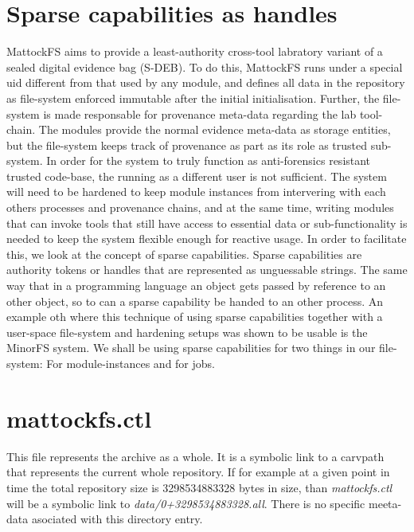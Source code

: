 \section{Sparse capabilities as handles}
MattockFS aims to provide a least-authority cross-tool labratory variant of a sealed digital evidence bag (S-DEB). To do this, MattockFS runs under a special uid different from that used by any module, and defines all data in the repository as file-system enforced immutable after the initial initialisation. Further, the file-system is made responsable for provenance meta-data regarding the lab tool-chain. The modules provide the normal evidence meta-data as storage entities, but the file-system keeps track of provenance as part as its role as trusted sub-system. In order for the system to truly function as anti-forensics resistant trusted code-base, the running as a different user is not sufficient. The system will need to be hardened to keep module instances from intervering with each others processes and provenance chains, and at the same time, writing modules that can invoke tools that still have access to essential data or sub-functionality is needed to keep the system flexible enough for reactive usage.
In order to facilitate this, we look at the concept of sparse capabilities. Sparse capabilities are authority tokens or handles that are represented as unguessable strings. The same way that in a programming language an object gets passed by reference to an other object, so to can a sparse capability be handed to an other process. An example oth where this technique of using sparse capabilities together with a user-space file-system and hardening setups was shown to be usable is the MinorFS system. We shall be using sparse capabilities for two things in our file-system: For module-instances and for jobs.  
\section{mattockfs.ctl}
This file represents the archive as a whole. It is a symbolic link to a carvpath that represents the current whole repository.
If for example at a given point in time the total repository size is 3298534883328 bytes in size, than \emph{mattockfs.ctl} will be a symbolic link to \emph{data/0+3298534883328.all}. There is no specific meeta-data asociated with this directory entry.
